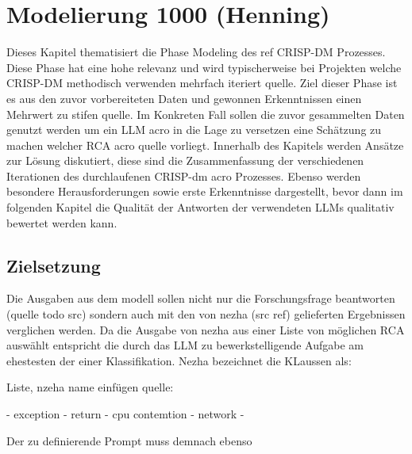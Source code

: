 \chapter{Modelierung 1000 (Henning)}
\label{sec:Kapitel3}

Dieses Kapitel thematisiert die Phase Modeling des ref CRISP-DM Prozesses. Diese Phase hat eine hohe relevanz und wird typischerweise bei Projekten welche CRISP-DM methodisch verwenden mehrfach iteriert quelle. Ziel dieser Phase ist es aus den zuvor vorbereiteten Daten und gewonnen Erkenntnissen einen Mehrwert zu stifen quelle. Im Konkreten Fall sollen die zuvor gesammelten Daten genutzt werden um ein LLM acro in die Lage zu versetzen eine Schätzung zu machen welcher RCA acro quelle vorliegt. Innerhalb des Kapitels werden Ansätze zur Lösung diskutiert, diese sind die Zusammenfassung der verschiedenen Iterationen des durchlaufenen CRISP-dm acro Prozesses. Ebenso werden besondere Herausforderungen sowie erste Erkenntnisse dargestellt, bevor dann im folgenden Kapitel die Qualität der Antworten der verwendeten LLMs qualitativ bewertet werden kann. 

\section{Zielsetzung}
\label{sec:Zielsetzung}

Die Ausgaben aus dem modell sollen nicht nur die Forschungsfrage beantworten (quelle todo src) sondern auch mit den von nezha (src ref) gelieferten Ergebnissen verglichen werden. Da die Ausgabe von nezha aus einer Liste von möglichen RCA auswählt entspricht die durch das LLM zu bewerkstelligende Aufgabe am ehestesten der einer Klassifikation. Nezha bezeichnet die KLaussen als:

Liste, nzeha name einfügen quelle:

  - exception
  - return
  - cpu contemtion
  - network
  -

  Der zu definierende Prompt muss demnach ebenso 

